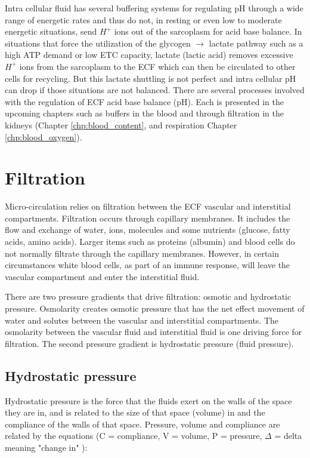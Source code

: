 Intra cellular fluid has several buffering systems for regulating pH through a wide range of energetic rates and thus do not, in resting or even low to moderate energetic situations, send $H^+$ ions out of the sarcoplasm for acid base balance. In situations that force the utilization of the glycogen $\rightarrow$ lactate pathway such as a high ATP demand or low ETC capacity, lactate (lactic acid) removes excessive $H^+$ ions from the sarcoplasm to the ECF which can then be circulated to other cells for recycling. But this lactate shuttling is not perfect and intra cellular pH can drop if those situations are not balanced.
There are several processes involved with the regulation of ECF acid base balance (pH). Each is presented in the upcoming chapters such as buffers in the blood and through filtration in the kidneys (Chapter \ref{chp:blood_content}, and respiration Chapter \ref{chp:blood_oxygen}).


\section{Filtration}

Micro-circulation relies on filtration between the ECF vascular and interstitial compartments. Filtration occurs through capillary membranes. It includes the flow and exchange of water, ions, molecules and some nutrients (glucose, fatty acids, amino acids). Larger items such as proteins (albumin) and blood cells do not normally filtrate through the capillary membranes. However, in certain circumstances white blood cells, as part of an immune response, will leave the vascular compartment and enter the interstitial fluid.

There are two pressure gradients that drive filtration: osmotic and hydrostatic pressure. Osmolarity creates osmotic pressure that has the net effect movement of water and solutes between the vascular and interstitial compartments. The osmolarity between the vascular fluid and interstitial fluid is one driving force for filtration. The second pressure gradient is hydrostatic pressure (fluid pressure). 

\subsection{Hydrostatic pressure}
Hydrostatic pressure is the force that the fluids exert on the walls of the space they are in, and is related to the size of that space (volume) in and the compliance of the walls of that space.\footnotemark{} Pressure, volume and compliance are related by the equations (C = compliance, V = volume, P = pressure, $\Delta$ = delta meaning "change in" ):

